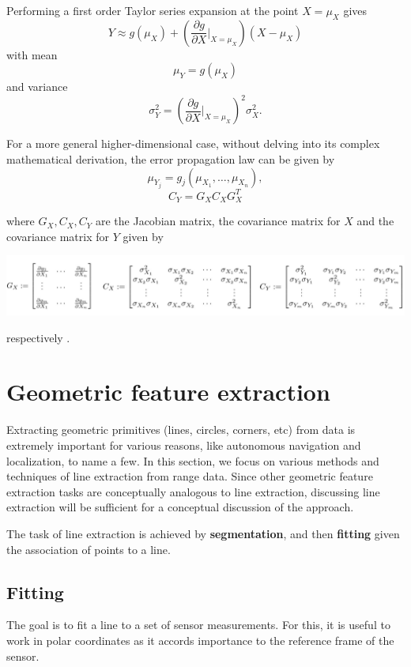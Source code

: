 \documentclass[twoside]{article}
\begin{document}
Performing a first order Taylor series expansion at the point $X = \mu_X$ gives
$$Y \approx g(\mu_{X}) + \left(\frac{\partial g}{\partial X}\bigg\rvert_{X=\mu_X}\right) (X-\mu_X)$$
with mean
$$\mu_Y = g(\mu_X)$$
and variance
$$\sigma_Y^2 = \left(\frac{\partial g}{\partial X}\bigg\rvert_{X=\mu_X}\right)^2 \sigma_X^2.$$

For a more general higher-dimensional case, without delving into its complex mathematical derivation, the error propagation law can be given by 
$$\mu_{Y_j} = g_j(\mu_{X_1}, \dots, \mu_{X_n}),$$
$$C_Y = G_X C_X G_X^T$$

where $G_X, C_X, C_Y$ are the Jacobian matrix, the covariance matrix for $X$ and the covariance matrix for $Y$ given by 
\begin{center}
	\includegraphics[width=1\textwidth]{errorpropagation_general}
\end{center}
respectively \cite{SNS}. 


\section{Geometric feature extraction}
Extracting geometric primitives (lines, circles, corners, etc) from data is extremely important for various reasons, like autonomous navigation and localization, to name a few. In this section, we focus on various methods and techniques of line extraction from range data. Since other geometric feature extraction tasks are conceptually analogous to line extraction, discussing line extraction will be sufficient for a conceptual discussion of the approach. 

The task of line extraction is achieved by \textbf{segmentation}, and then \textbf{fitting} given the association of points to a line. 

\subsection{Fitting}
The goal is to fit a line to a set of sensor measurements. For this, it is useful to work in polar coordinates as it accords importance to the reference frame of the sensor.
\end{document}
